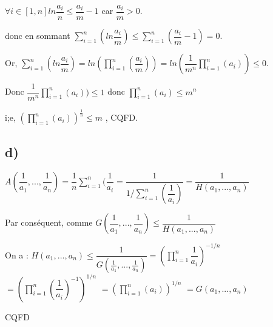 \documentclass[11pt]{article}
\begin{document}
$\forall i \in [1,n] ln \dfrac{a_i}{n} \leq \dfrac{a_i}{m} - 1$ car $\dfrac{a_i}{m} > 0$.

donc en sommant $\sum_{i=1}^{n}(ln \dfrac{a_i}{m}) \leq \sum_{i=1}^{n}(\dfrac{a_i}{m}- 1) = 0$.

Or, $\sum_{i=1}^{n}(ln \dfrac{a_i}{m}) = ln (\prod_{i=1}^{n}(\dfrac{a_i}{m})) = ln (\dfrac{1}{m^n} \prod_{i=1}^{n}(a_i)) \leq 0 $.

Donc $\dfrac{1}{m^n} \prod_{i=1}^{n}(a_i)) \leq 1 $ donc $\prod_{i=1}^{n}(a_i) \leq m^n$ 

i;e, $ (\prod_{i=1}^{n}(a_i))^{\frac{1}{n}} \leq m$ , CQFD.

\subsection*{d)}

$A(\dfrac{1}{a_1},...,\dfrac{1}{a_n}) = \dfrac{1}{n} \sum_{i=1}^{n}(\dfrac{1}{a_i} = \dfrac{1}{1 / \sum_{i=1}^{n}(\dfrac{1}{a_i})} = \dfrac{1}{H(a_1,..., a_n)}$

Par conséquent, comme $G(\dfrac{1}{a_1},...,\dfrac{1}{a_n}) \leq \dfrac{1}{H(a_1,..., a_n)}$


On a : $H(a_{1},..., a_{n}) \leq \dfrac{1}{ G( \frac{1}{a_1},...,\frac{1}{a_n} ) } = (\prod_{i=1}^{n} \dfrac{1}{a_i})^{-1/n}$ \newline
$= (\prod_{i=1}^{n} (\dfrac{1}{a_i})^{-1})^{1/n}$ \newline
$= (\prod_{i=1}^{n} (a_i))^{1/n}$ \newline
$= G(a_1,...,a_n)$

CQFD
\end{document}
